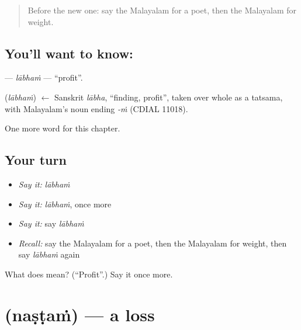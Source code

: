 \label{lesson:ML-C300-labham}



\begin{quote}
Before the new one: say the Malayalam for a poet, then the Malayalam for weight.
\end{quote}

\subsection*{You'll want to know: }
\textbf{} — \emph{lābhaṁ} — \textquotedblleft{}profit\textquotedblright{}.

\begin{cousinweb}
\textbf{} (\emph{lābhaṁ}) $\leftarrow$ Sanskrit \emph{lābha}, \textquotedblleft{}finding, profit\textquotedblright{}, taken over whole as a tatsama, with Malayalam's noun ending \emph{-ṁ} (CDIAL 11018).
\end{cousinweb}

\begin{grammarlens}[title={What you've built}]
One more word for this chapter.
\end{grammarlens}

\subsection*{Your turn}
\begin{itemize}
\raggedright
  \item \emph{Say it:} \emph{lābhaṁ}
  \item \emph{Say it:} \emph{lābhaṁ}, once more
  \item \emph{Say it:} say \emph{lābhaṁ}
  \item \emph{Recall:} say the Malayalam for a poet, then the Malayalam for weight, then say \emph{lābhaṁ} again
\end{itemize}

\begin{tcolorbox}[breakable,colback=teal!4,colframe=teal!35!black,title={Before you move on}]
What does  mean? (\textquotedblleft{}Profit\textquotedblright{}.) Say it once more.
\end{tcolorbox}
\section[\texorpdfstring{\ml{നഷ്ടം} (naṣṭaṁ)}{നഷ്ടം (naṣṭaṁ)}]{ (naṣṭaṁ) — a loss}

\label{lesson:ML-C300-nastam}



